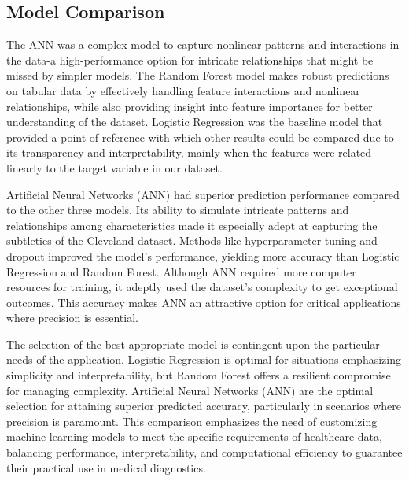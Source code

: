 \subsection{Model Comparison}
The ANN was a complex model to capture nonlinear patterns and interactions in the data-a high-performance option for intricate relationships that might be missed by simpler models. The Random Forest model makes robust predictions on tabular data by effectively handling feature interactions and nonlinear relationships, while also providing insight into feature importance for better understanding of the dataset. Logistic Regression was the baseline model that provided a point of reference with which other results could be compared due to its transparency and interpretability, mainly when the features were related linearly to the target variable in our dataset.

Artificial Neural Networks (ANN) had superior prediction performance compared to the other three models. Its ability to simulate intricate patterns and relationships among characteristics made it especially adept at capturing the subtleties of the Cleveland dataset. Methods like hyperparameter tuning and dropout improved the model's performance, yielding more accuracy than Logistic Regression and Random Forest. Although ANN required more computer resources for training, it adeptly used the dataset's complexity to get exceptional outcomes. This accuracy makes ANN an attractive option for critical applications where precision is essential.

The selection of the best appropriate model is contingent upon the particular needs of the application. Logistic Regression is optimal for situations emphasizing simplicity and interpretability, but Random Forest offers a resilient compromise for managing complexity. Artificial Neural Networks (ANN) are the optimal selection for attaining superior predicted accuracy, particularly in scenarios where precision is paramount. This comparison emphasizes the need of customizing machine learning models to meet the specific requirements of healthcare data, balancing performance, interpretability, and computational efficiency to guarantee their practical use in medical diagnostics.